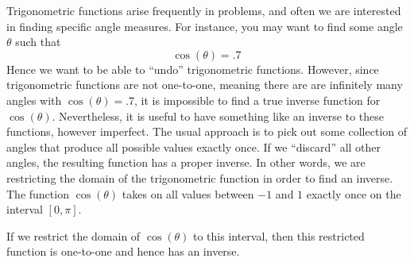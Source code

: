 \documentclass{ximera}
\begin{document}
Trigonometric functions arise frequently in problems, and often we are
interested in finding specific angle measures.  For instance, you may
want to find some angle $\theta$ such that
\[
\cos(\theta) = .7
\]
Hence we want to be able to ``undo'' trigonometric functions. However, since
trigonometric functions are not one-to-one, meaning there are are
infinitely many angles with $\cos(\theta) = .7$, it is impossible to
find a true inverse function for $\cos(\theta)$. Nevertheless, it is
useful to have something like an inverse to these functions, however
imperfect. The usual approach is to pick out some collection of angles
that produce all possible values exactly once. If we ``discard'' all
other angles, the resulting function has a proper inverse.  In other
words, we are restricting the domain of the trigonometric function in
order to find an inverse.  The function $\cos(\theta)$ takes on all
values between $-1$ and $1$ exactly once on the interval $[0,\pi]$.

\begin{image}
\end{image}
If we restrict the domain of $\cos(\theta)$ to this interval, then this
restricted function is one-to-one and hence has an inverse.
\end{document}
